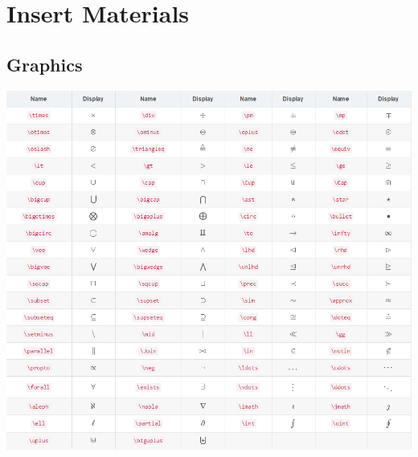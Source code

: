 \documentclass[11pt]{article}
\begin{document}
    \section{Insert Materials}

        \subsection{Graphics}
        \centering
        \includegraphics[scale = 0.2]{Operation_Sign.png}
\end{document}
